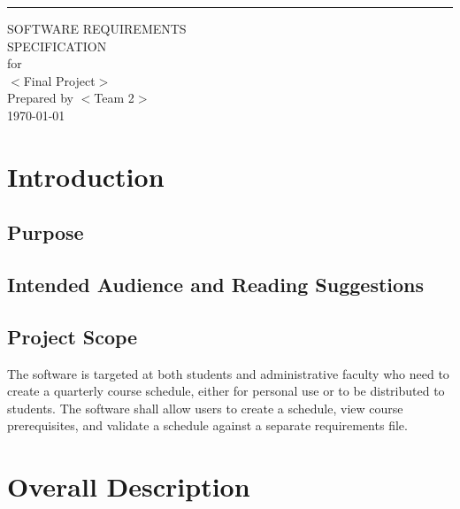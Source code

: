 \documentclass{scrreprt}
\date{}
\begin{document}
\begin{flushright}
    \rule{16cm}{5pt}\vskip1cm
    \begin{bfseries}
        \Huge{SOFTWARE REQUIREMENTS\\ SPECIFICATION}\\
        \vspace{1.9cm}
        for\\
        \vspace{1.9cm}
        $<$Final Project$>$\\
        \vspace{1.9cm}
        Prepared by $<$Team 2$>$\\
        \vspace{1.9cm}
        \today\\
    \end{bfseries}
\end{flushright}

\tableofcontents


\chapter{Introduction}

\section{Purpose}

\section{Intended Audience and Reading Suggestions}

\section{Project Scope}
The software is targeted at both students and administrative faculty who need to create a quarterly course schedule, either for personal use or to be distributed to students. The software shall allow users to create a schedule, view course prerequisites, and validate a schedule against a separate requirements file.

\chapter{Overall Description}
\end{document}
